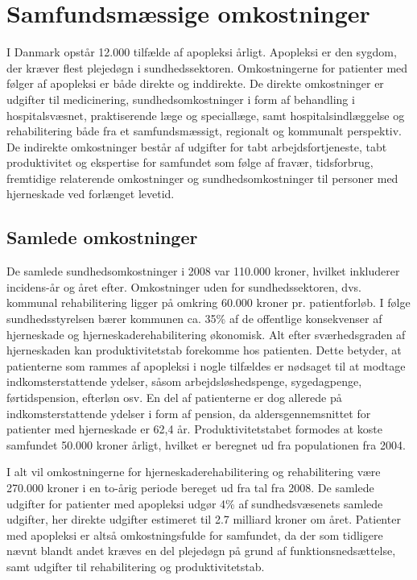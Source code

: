 \section{Samfundsmæssige omkostninger}
I Danmark opstår 12.000 tilfælde af apopleksi årligt. Apopleksi er den sygdom, der kræver flest plejedøgn i sundhedssektoren\cite{Kruuse2014}. %
Omkostningerne for patienter med følger af apopleksi er både direkte og inddirekte. De direkte omkostninger er udgifter til medicinering, sundhedsomkostninger i form af behandling i hospitalsvæsnet, praktiserende læge og speciallæge, samt hospitalsindlæggelse og rehabilitering både fra et samfundsmæssigt, regionalt og kommunalt perspektiv. De indirekte omkostninger  består af udgifter for tabt arbejdsfortjeneste, tabt produktivitet og ekspertise for samfundet som følge af fravær, tidsforbrug, fremtidige relaterende omkostninger og sundhedsomkostninger til personer med hjerneskade ved forlænget levetid.\cite{Sundhedsstyrelsen2010}

\subsection{Samlede omkostninger}
De samlede sundhedsomkostninger i 2008 var 110.000 kroner, hvilket inkluderer incidens-år og året efter. Omkostninger uden for sundhedssektoren, dvs. kommunal rehabilitering ligger på omkring 60.000 kroner pr. patientforløb. I følge sundhedsstyrelsen bærer kommunen ca. 35\% af de offentlige konsekvenser af hjerneskade og hjerneskaderehabilitering økonomisk.    
Alt efter sværhedsgraden af hjerneskaden kan produktivitetstab forekomme hos patienten. Dette betyder, at patienterne som rammes af apopleksi i nogle tilfældes er nødsaget til at modtage indkomsterstattende ydelser, såsom arbejdsløshedspenge, sygedagpenge, førtidspension, efterløn osv. En del af patienterne er dog allerede på indkomsterstattende ydelser i form af pension, da aldersgennemsnittet for patienter med hjerneskade er 62,4 år. Produktivitetstabet formodes at koste samfundet 50.000 kroner årligt, hvilket er beregnet ud fra populationen fra 2004.\cite{Sundhedsstyrelsen2010} 

I alt vil omkostningerne for hjerneskaderehabilitering og rehabilitering være 270.000 kroner i en to-årig periode bereget ud fra tal fra 2008\cite{Sundhedsstyrelsen2010}. De samlede udgifter for patienter med apopleksi udgør 4\% af sundhedsvæsenets samlede udgifter, her direkte udgifter estimeret til 2.7 milliard kroner om året\cite{Hjernesagen2015a}. 
Patienter med apopleksi er altså omkostningsfulde for samfundet, da der som tidligere nævnt blandt andet kræves en del plejedøgn på grund af funktionsnedsættelse, samt udgifter til rehabilitering og produktivitetstab.

